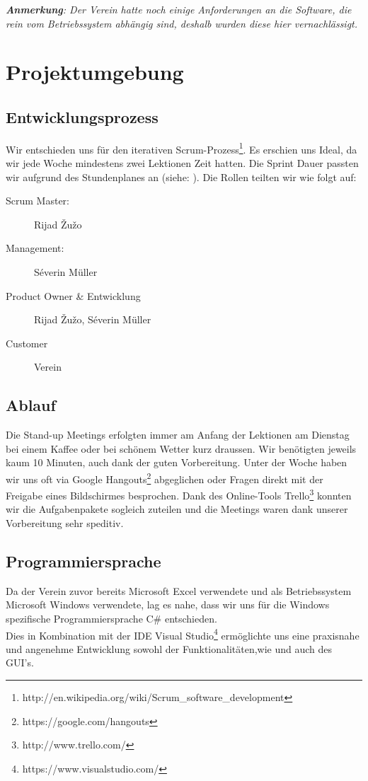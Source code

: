\documentclass{article}
\begin{document}
\vspace{2cm}

\textit{\textbf{Anmerkung}: Der Verein hatte noch einige Anforderungen an die Software, die rein vom Betriebssystem abhängig sind, deshalb wurden diese hier vernachlässigt.}
	

\newpage


\section{Projektumgebung}
\vspace{5mm}
\subsection{Entwicklungsprozess	}
Wir entschieden uns für den iterativen Scrum-Prozess\footnote{http://en.wikipedia.org/wiki/Scrum\_software\_development}. Es erschien uns Ideal, da wir jede Woche mindestens zwei Lektionen Zeit hatten. Die Sprint Dauer passten wir aufgrund des Stundenplanes an (siehe: ). Die Rollen teilten wir wie folgt auf:

\begin{description}
	\item[Scrum Master:] Rijad \v{Z}u\v{z}o
	\item[Management:] Séverin Müller
	\item[Product Owner \& Entwicklung] Rijad \v{Z}u\v{z}o, Séverin Müller
	\item[Customer] Verein
\end{description}

\subsection{Ablauf}
Die Stand-up Meetings erfolgten immer am Anfang der Lektionen am Dienstag bei einem Kaffee oder bei schönem Wetter kurz draussen. Wir benötigten jeweils kaum 10 Minuten, auch dank der guten Vorbereitung. Unter der Woche haben wir uns oft via Google Hangouts\footnote{https://google.com/hangouts} abgeglichen oder Fragen direkt mit der Freigabe eines Bildschirmes besprochen. 
Dank des Online-Tools Trello\footnote{http://www.trello.com/}  konnten wir die Aufgabenpakete sogleich zuteilen und die Meetings waren dank unserer Vorbereitung sehr speditiv. 

\subsection{Programmiersprache}
Da der Verein zuvor bereits Microsoft Excel verwendete und als Betriebssystem Microsoft Windows verwendete, lag es nahe, dass wir uns für die Windows spezifische Programmiersprache C\# entschieden. \\ Dies in Kombination mit der IDE Visual Studio\footnote{https://www.visualstudio.com/} ermöglichte uns eine praxisnahe und angenehme Entwicklung sowohl der Funktionalitäten,wie und auch des GUI's. 
\end{document}
